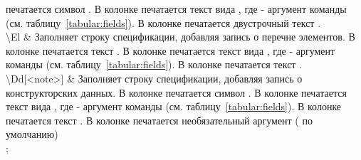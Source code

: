 \begin{tikztablex}
{\colorbox{resultcolor}{} печатается символ \bfemph{*}. В колонке
\colorbox{resultcolor}{} печатается текст вида ,
где  - аргумент команды
(см. таблицу~\ref{tabular:fields}). В колонке
\colorbox{resultcolor}{} печатается двустрочный текст
.\\
\textbackslash{}El &
Заполняет строку спецификации, добавляя запись о перечне элементов.
В колонке \colorbox{resultcolor}{} печатается текст .
В колонке \colorbox{resultcolor}{} печатается текст вида
, где  - аргумент команды
(см. таблицу~\ref{tabular:fields}). В колонке
\colorbox{resultcolor}{} печатается текст
.\\
\textbackslash{}Dd[<note>] &
Заполняет строку спецификации, добавляя запись о конструкторских данных. В колонке
\colorbox{resultcolor}{} печатается символ \sfemph{-}. В колонке
\colorbox{resultcolor}{} печатается текст вида
, где  - аргумент команды
(см. таблицу~\ref{tabular:fields}). В колонке
\colorbox{resultcolor}{} печатается текст . В колонке \colorbox{resultcolor}{} печатается
необязательный аргумент ( по умолчанию)\\
};
\end{tikztablex}

\clearpage


